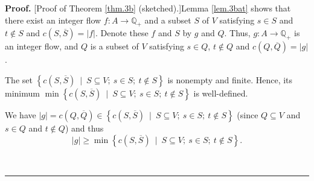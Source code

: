 \documentclass[numbers=enddot,12pt,final,onecolumn,notitlepage]{scrartcl}%
\theoremstyle{definition}
\newenvironment{proof}[1][Proof]{\noindent\textbf{#1.} }{\ \rule{0.5em}{0.5em}}
\begin{document}
\begin{proof}
[Proof of Theorem \ref{thm.3b} (sketched).]Lemma \ref{lem.3bat} shows that
there exist an integer flow $f:A\rightarrow\mathbb{Q}_{+}$ and a subset $S$ of
$V$ satisfying $s\in S$ and $t\notin S$ and $c\left(  S,\overline{S}\right)
=\left\vert f\right\vert $. Denote these $f$ and $S$ by $g$ and $Q$. Thus,
$g:A\rightarrow\mathbb{Q}_{+}$ is an integer flow, and $Q$ is a subset of $V$
satisfying $s\in Q$, $t\notin Q$ and $c\left(  Q,\overline{Q}\right)
=\left\vert g\right\vert $.

The set $\left\{  c\left(  S,\overline{S}\right)  \ \mid\ S\subseteq V;\ s\in
S;\ t\notin S\right\}  $ is nonempty and finite. Hence, its minimum
$\min\left\{  c\left(  S,\overline{S}\right)  \ \mid\ S\subseteq V;\ s\in
S;\ t\notin S\right\}  $ is well-defined.

We have $\left\vert g\right\vert =c\left(  Q,\overline{Q}\right)  \in\left\{
c\left(  S,\overline{S}\right)  \ \mid\ S\subseteq V;\ s\in S;\ t\notin
S\right\}  $ (since $Q\subseteq V$ and $s\in Q$ and $t\notin Q$) and thus%
\begin{equation}
\left\vert g\right\vert \geq\min\left\{  c\left(  S,\overline{S}\right)
\ \mid\ S\subseteq V;\ s\in S;\ t\notin S\right\}  . \label{pf.thm.3b.1}%
\end{equation}



\end{proof}
\end{document}
